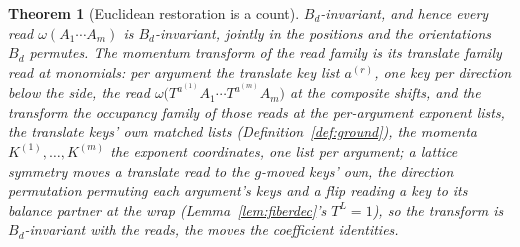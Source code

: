 \documentclass[11pt]{article}
\newtheorem{theorem}{Theorem}
\theoremstyle{definition}
\begin{document}
\begin{theorem}[Euclidean restoration is a count]
$B_d$-invariant, and hence every read
$\omega(A_1\cdots A_m)$ is $B_d$-invariant, jointly in the positions and the
orientations $B_d$ permutes. The \emph{momentum transform} of the
read family is its translate family read at monomials: per
argument the translate key list $a^{(r)}$, one key per direction
below the side, the read
$\omega\big(T^{a^{(1)}}A_1\cdots T^{a^{(m)}}A_m\big)$ at the
composite shifts, and the transform the occupancy family of those
reads at the per-argument exponent lists, the translate keys'
own matched lists (Definition~\ref{def:ground}), the momenta
$K^{(1)},\dots,K^{(m)}$ the exponent coordinates, one list per
argument; a lattice symmetry moves a translate read to
the $g$-moved keys' own, the direction permutation permuting each
argument's keys and a flip reading a key to its balance partner
at the wrap (Lemma~\ref{lem:fiberdec}'s $T^L=1$), so the
transform is $B_d$-invariant with the reads, the moves the
coefficient identities.


\end{theorem}
\end{document}
